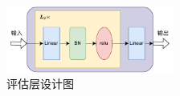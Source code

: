 \begin{figure}[htbp]
    \centering
    \includegraphics[width=0.49\textwidth]{评估层设计图.pdf}
    \caption{评估层设计图}
    \label{fig:评估层设计图}
\end{figure}